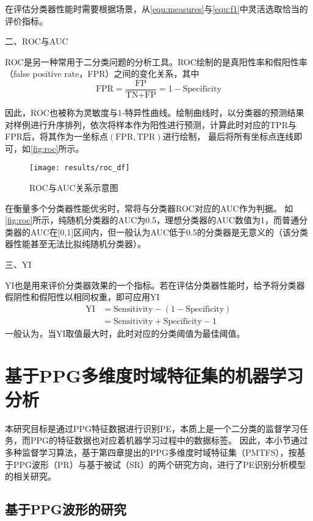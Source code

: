 在评估分类器性能时需要根据场景，从\autoref{equ:measures}与\autoref{equ:f1}中灵活选取恰当的评价指标。

二、ROC与AUC

ROC是另一种常用于二分类问题的分析工具。ROC绘制的是真阳性率和假阳性率（false positive rate，FPR）之间的变化关系，其中
\begin{equation}
    \label{equ:fpr}
    \text{FPR}=\frac{\text{FP}}{\text{TN+FP}}=1-\text{Specificity}
\end{equation}

因此，ROC也被称为灵敏度与1-特异性曲线。绘制曲线时，以分类器的预测结果对样例进行升序排列，依次将样本作为阳性进行预测，计算此时对应的TPR与FPR后，将其作为一坐标点$(\text{FPR},\text{TPR})$进行绘制，
最后将所有坐标点连线即可，如\autoref{fig:roc}所示。
\begin{figure}[htbp]
    \centering
    \texttt{[image: results/roc\_df]}
    \caption[ROC曲线与AUC关系示意图]{\label{fig:roc}ROC与AUC关系示意图}
\end{figure}

在衡量多个分类器性能优劣时，常将与分类器ROC对应的AUC作为判据。
如\autoref{fig:roc}所示，纯随机分类器的AUC为0.5，理想分类器的AUC数值为1，而普通分类器的AUC在[0,1]区间内，但一般认为AUC低于0.5的分类器是无意义的（该分类器性能甚至无法比拟纯随机分类器）\cite{Aurélien2018}。

三、YI

YI也是用来评价分类器效果的一个指标。若在评估分类器性能时，给予将分类器假阴性和假阳性以相同权重，即可应用YI
\begin{equation}
    \label{equ:yi}
    \begin{aligned}
        \text{YI}&=\text{Sensitivity}-(1-\text{Specificity})\\
        &=\text{Sensitivity}+\text{Specificity}-1
    \end{aligned}
\end{equation}
一般认为，当YI取值最大时，此时对应的分类阈值为最佳阈值。

\section{基于PPG多维度时域特征集的机器学习分析}
本研究目标是通过PPG特征数据进行识别PE，本质上是一个二分类的监督学习任务，而PPG的特征数据也对应着机器学习过程中的数据标签。
因此，本小节通过多种监督学习算法，基于第四章提出的PPG多维度时域特征集（PMTFS），按基于PPG波形（PR）与基于被试（SR）的两个研究方向，进行了PE识别分析模型的相关研究。

\subsection{基于PPG波形的研究}

